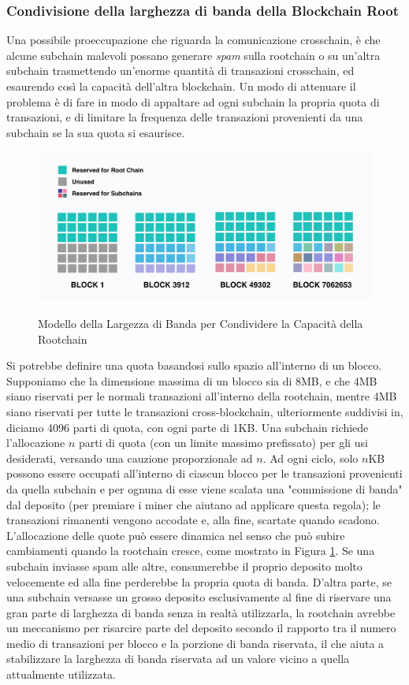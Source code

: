 \subsubsection{Condivisione della larghezza di banda della Blockchain Root}
Una possibile proeccupazione che riguarda la comunicazione crosschain, è che alcune subchain malevoli possano generare \emph{spam} sulla rootchain o su un'altra subchain trasmettendo un'enorme quantità di transazioni crosschain, ed esaurendo così la capacità dell'altra blockchain. Un modo di attenuare il problema è di fare in modo di appaltare ad ogni subchain la propria quota di transazioni, e di limitare la frequenza delle transazioni provenienti da una subchain se la sua quota si esaurisce.

\begin{figure}[ht]
	\includegraphics[width=\textwidth]{Figura3.png}
	\label{fig:fig3}
	\caption{Modello della Largezza di Banda per Condividere la Capacità della Rootchain}
\end{figure}

Si potrebbe definire una quota basandosi sullo spazio all'interno di un blocco. Supponiamo che la dimensione massima di un blocco sia di 8MB, e che 4MB siano riservati per le normali transazioni all'interno della rootchain, mentre 4MB siano riservati per tutte le transazioni cross-blockchain, ulteriormente suddivisi in, diciamo 4096 parti di quota, con ogni parte di 1KB. Una subchain richiede l'allocazione $n$ parti di quota (con un limite massimo prefissato) per gli usi desiderati, versando una cauzione proporzionale ad $n$. Ad ogni ciclo, solo $n$KB possono essere occupati all'interno di ciascun blocco per le transazioni provenienti da quella subchain e per ognuna di esse viene scalata una "commissione di banda" dal deposito (per premiare i miner che aiutano ad applicare questa regola); le transazioni rimanenti vengono accodate e, alla fine, scartate quando scadono. L'allocazione delle quote può essere dinamica nel senso che può subire cambiamenti quando la rootchain cresce, come mostrato in Figura \ref{fig:fig3}. Se una subchain inviasse spam alle altre, consumerebbe il proprio deposito molto velocemente ed alla fine perderebbe la propria quota di banda. D'altra parte, se una subchain versasse un grosso deposito esclusivamente al fine di riservare una gran parte di larghezza di banda senza in realtà utilizzarla, la rootchain avrebbe un meccanismo per risarcire parte del deposito secondo il rapporto tra il numero medio di transazioni per blocco e la porzione di banda riservata, il che aiuta a stabilizzare la larghezza di banda riservata ad un valore vicino a quella attualmente utilizzata.